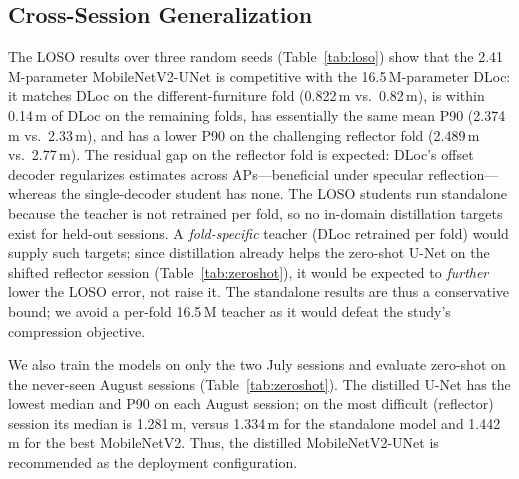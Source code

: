 \documentclass[conference,a4paper]{IEEEtran}
\begin{document}
\subsection{Cross-Session Generalization}
\label{sec:cross}
The LOSO results over three random seeds (Table~\ref{tab:loso}) show that the 2.41\,M-parameter MobileNetV2-UNet is competitive with the 16.5\,M-parameter DLoc: it matches DLoc on the different-furniture fold (0.822\,m vs.\ 0.82\,m), is within 0.14\,m of DLoc on the remaining folds, has essentially the same mean P90 (2.374\,m vs.\ 2.33\,m), and has a lower P90 on the challenging reflector fold (2.489\,m vs.\ 2.77\,m). The residual gap on the reflector fold is expected: DLoc's offset decoder regularizes estimates across APs---beneficial under specular reflection---whereas the single-decoder student has none. The LOSO students run standalone because the teacher is not retrained per fold, so no in-domain distillation targets exist for held-out sessions. A \emph{fold-specific} teacher (DLoc retrained per fold) would supply such targets; since distillation already helps the zero-shot U-Net on the shifted reflector session (Table~\ref{tab:zeroshot}), it would be expected to \emph{further} lower the LOSO error, not raise it. The standalone results are thus a conservative bound; we avoid a per-fold 16.5\,M teacher as it would defeat the study's compression objective.

We also train the models on only the two July sessions and evaluate zero-shot on the never-seen August sessions (Table~\ref{tab:zeroshot}). The distilled U-Net has the lowest median and P90 on each August session; on the most difficult (reflector) session its median is 1.281\,m, versus 1.334\,m for the standalone model and 1.442\,m for the best MobileNetV2. Thus, the distilled MobileNetV2-UNet is recommended as the deployment configuration.

\begin{table}[t]
\caption{Leave-One-Session-Out vs.\ Published DLoc (Mean$\pm$Std, 3 Seeds; Ours = Standalone MobileNetV2-UNet).}
\label{tab:loso}
\centering
\scriptsize
\setlength{\tabcolsep}{3pt}
\end{table}
\end{document}
